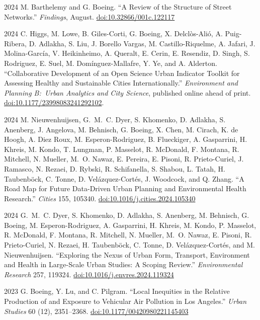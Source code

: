 \documentclass[11pt,letterpaper]{report} %
\begin{document}
\begin{tablist}
        \item[2024] \tab{}M. Barthelemy and G. Boeing. \enquote{A Review of the Structure of Street Networks.} \textit{Findings}, August. \href{https://doi.org/10.32866/001c.122117}{doi:10.32866/001c.122117}

        \item[2024] \tab{}C. Higgs, M. Lowe, B. Giles-Corti, G. Boeing, X. Delclòs-Alió, A. Puig-Ribera, D. Adlakha, S. Liu, J. Borello Vargas, M. Castillo-Riquelme, A. Jafari, J. Molina-García, V. Heikinheimo, A. Queralt, E. Cerin, E. Resendiz, D. Singh, S. Rodriguez, E. Suel, M. Domínguez-Mallafre, Y. Ye, and A. Alderton. \enquote{Collaborative Development of an Open Science Urban Indicator Toolkit for Assessing Healthy and Sustainable Cities Internationally.} \textit{Environment and Planning B:\ Urban Analytics and City Science}, published online ahead of print. \href{https://doi.org/10.1177/23998083241292102}{doi:10.1177/23998083241292102}.

        \item[2024] \tab{}M. Nieuwenhuijsen, G.~M.~C. Dyer, S. Khomenko, D. Adlakha, S. Anenberg, J. Angelova, M. Behnisch, G. Boeing, X. Chen, M. Cirach, K. de Hoogh, A. Diez Roux, M. Esperon-Rodriguez, B. Flueckiger, A. Gasparrini, H. Khreis, M. Kondo, T. Lungman, P. Masselot, R. McDonald, F. Montana, R. Mitchell, N. Mueller, M.~O. Nawaz, E. Pereira, E. Pisoni, R. Prieto-Curiel, J. Ramasco, N. Rezaei, D. Rybski, R. Schifanella, S. Shabou, L. Tatah, H. Taubenböck, C. Tonne, D. Velázquez-Cortés, J. Woodcock, and Q. Zhang. \enquote{A Road Map for Future Data-Driven Urban Planning and Environmental Health Research.} \textit{Cities} 155, 105340. \href{https://doi.org/10.1016/j.cities.2024.105340}{doi:10.1016/j.cities.2024.105340}

        \item[2024] \tab{}G.~M.~C. Dyer, S. Khomenko, D. Adlakha, S. Anenberg, M. Behnisch, G. Boeing, M. Esperon-Rodriguez, A. Gasparrini, H. Khreis, M. Kondo, P. Masselot, R. McDonald, F. Montana, R. Mitchell, N. Mueller, M.~O. Nawaz, E. Pisoni, R. Prieto-Curiel, N. Rezaei, H. Taubenböck, C. Tonne, D. Velázquez-Cortés, and M. Nieuwenhuijsen. \enquote{Exploring the Nexus of Urban Form, Transport, Environment and Health in Large-Scale Urban Studies: A Scoping Review.} \textit{Environmental Research} 257, 119324. \href{https://doi.org/10.1016/j.envres.2024.119324}{doi:10.1016/j.envres.2024.119324}

        \item[2023] \tab{}G. Boeing, Y. Lu, and C. Pilgram. \enquote{Local Inequities in the Relative Production of and Exposure to Vehicular Air Pollution in Los Angeles.} \textit{Urban Studies} 60 (12), 2351--2368. \href{https://doi.org/10.1177/00420980221145403}{doi:10.1177/00420980221145403}


\end{tablist}
\end{document}
